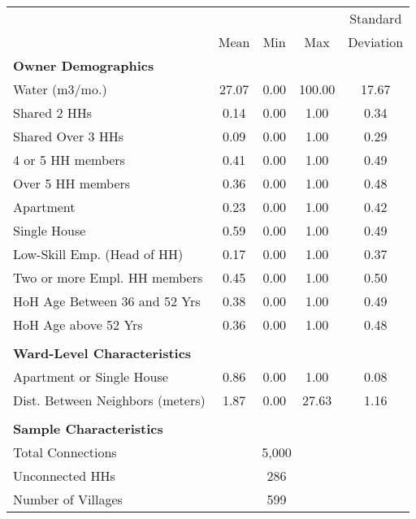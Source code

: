 \begin{tabular}{l*{1}{cccc}}
 & & & &Standard  \\
 &Mean &Min &Max &Deviation  \\
\textbf{Owner Demographics} &\multicolumn{4}{c}{ }\\
\hline
Water (m3/mo.) &      27.07  &       0.00  &     100.00  &      17.67   \\
Shared 2 HHs &       0.14  &       0.00  &       1.00  &       0.34   \\
Shared Over 3 HHs &       0.09  &       0.00  &       1.00  &       0.29   \\
4 or 5 HH members &       0.41  &       0.00  &       1.00  &       0.49   \\
Over 5 HH members &       0.36  &       0.00  &       1.00  &       0.48   \\
Apartment &       0.23  &       0.00  &       1.00  &       0.42   \\
Single House &       0.59  &       0.00  &       1.00  &       0.49   \\
Low-Skill Emp. (Head of HH) &       0.17  &       0.00  &       1.00  &       0.37   \\
Two or more Empl. HH members &       0.45  &       0.00  &       1.00  &       0.50   \\
HoH Age Between 36 and 52 Yrs &       0.38  &       0.00  &       1.00  &       0.49   \\
HoH Age above 52 Yrs &       0.36  &       0.00  &       1.00  &       0.48   \\
\hline \\
\textbf{Ward-Level Characteristics} &\multicolumn{4}{c}{ }\\
\hline
Apartment or Single House &       0.86  &       0.00  &       1.00  &       0.08   \\
Dist. Between Neighbors (meters) &       1.87  &       0.00  &      27.63  &       1.16   \\
\hline \\
\textbf{Sample Characteristics} &\multicolumn{4}{c}{ }\\
\hline
 Total Connections &\multicolumn{3}{c}{5,000 }\\
 Unconnected HHs &\multicolumn{3}{c}{286 }\\
 Number of Villages &\multicolumn{3}{c}{599 }\\
\hline
\hline
\end{tabular}